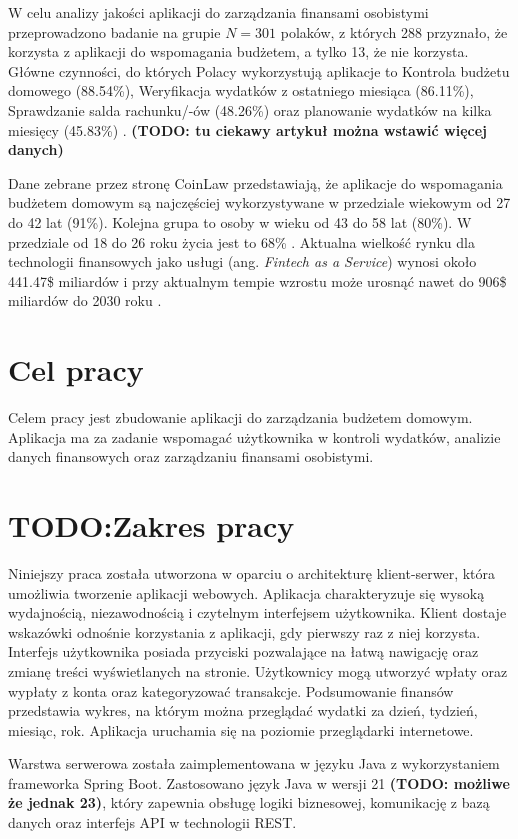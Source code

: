 W celu analizy jakości aplikacji do zarządzania finansami osobistymi przeprowadzono badanie na grupie $N=301$ polaków, z których 288 przyznało, że korzysta z aplikacji do wspomagania budżetem, a tylko 13, że nie korzysta. Główne czynności, do których Polacy wykorzystują aplikacje to Kontrola budżetu domowego (88.54\%), Weryfikacja wydatków z ostatniego miesiąca (86.11\%), Sprawdzanie salda rachunku/-ów (48.26\%) oraz planowanie wydatków na kilka miesięcy (45.83\%) \cite{PFMApp}. \textbf{(TODO: tu ciekawy artykuł można wstawić więcej danych)}

Dane zebrane przez stronę CoinLaw przedstawiają, że aplikacje do wspomagania budżetem domowym są najczęściej wykorzystywane w przedziale wiekowym od 27 do 42 lat (91\%). Kolejna grupa to osoby w wieku od 43 do 58 lat (80\%). W przedziale od 18 do 26 roku życia jest to 68\% \cite{FintechStats}. Aktualna wielkość rynku dla technologii finansowych jako usługi (ang. \textit{Fintech as a Service}) wynosi około 441.47\$ miliardów i przy aktualnym tempie wzrostu może urosnąć nawet do 906\$ miliardów do 2030 roku \cite{FaaS}.


\section{Cel pracy}
Celem pracy jest zbudowanie aplikacji do zarządzania budżetem domowym. Aplikacja ma za zadanie wspomagać użytkownika w kontroli wydatków, analizie danych finansowych oraz zarządzaniu finansami osobistymi.
\section{TODO:Zakres pracy}
Niniejszy praca została utworzona w oparciu o architekturę klient-serwer, która umożliwia tworzenie aplikacji webowych. Aplikacja charakteryzuje się wysoką wydajnością, niezawodnością i czytelnym interfejsem użytkownika. Klient dostaje wskazówki odnośnie korzystania z aplikacji, gdy pierwszy raz z niej korzysta. Interfejs użytkownika posiada przyciski pozwalające na łatwą nawigację oraz zmianę treści wyświetlanych na stronie. Użytkownicy mogą utworzyć wpłaty oraz wypłaty z konta oraz kategoryzować transakcje. Podsumowanie finansów przedstawia wykres, na którym można przeglądać wydatki za dzień, tydzień, miesiąc, rok. Aplikacja uruchamia się na poziomie przeglądarki internetowe.

Warstwa serwerowa została zaimplementowana w języku Java z wykorzystaniem frameworka Spring Boot. Zastosowano język Java w wersji 21 \textbf{(TODO: możliwe że jednak 23)}, który zapewnia obsługę logiki biznesowej, komunikację z bazą danych oraz interfejs API w technologii REST.

